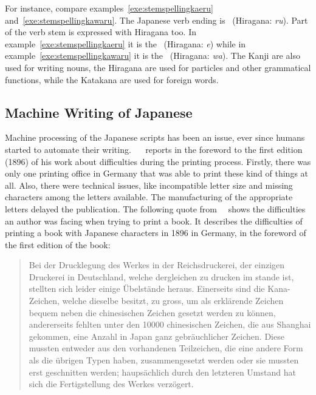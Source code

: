 For instance, compare examples~\ref{exe:stemspellingkaeru}
and~\ref{exe:stemspellingkawaru}. 
The Japanese verb ending is 
~(Hiragana: \emph{ru}). Part of the verb stem is expressed with
Hiragana too. In example~\ref{exe:stemspellingkaeru} it is the 
~(Hiragana: \emph{e}) while in example~\ref{exe:stemspellingkawaru} 
it is the ~(Hiragana: \emph{wa}).
The Kanji are also used for writing nouns, the Hiragana are used for particles 
and other grammatical functions, while the Katakana are used for foreign words.


\subsection{Machine Writing of Japanese}
\label{sec:machinewritingofjapanese}

Machine processing of the Japanese scripts has been an issue, ever since humans
started to automate their writing. 
~~\citeyear{Lange1922} reports in the foreword to the 
first edition (1896) of his work about difficulties during the printing process. 
Firstly, there was only one printing office in Germany that was able to print 
these kind of things at all. Also, there were technical issues, 
like incompatible letter size and missing characters among the letters 
available. The manufacturing of the appropriate letters delayed the publication.
The following quote from~~\citeyear{Lange1922} shows the 
difficulties an author was facing when trying to print a book. 
It describes the difficulties of printing a book with Japanese characters
in 1896 in Germany, in the foreword of the first edition of the book:
\begin{quote}
Bei der Drucklegung des Werkes in der Reichsdruckerei, der einzigen Druckerei 
in Deutschland, welche dergleichen zu drucken im stande ist, stellten sich 
leider einige Übelstände heraus. Einerseits sind die Kana-Zeichen, 
welche dieselbe besitzt, zu gross, um als erklärende Zeichen bequem neben die 
chinesischen Zeichen gesetzt werden zu können, andererseits fehlten unter den 
10000 chinesischen Zeichen, die aus Shanghai gekommen, eine Anzahl in Japan 
ganz gebräuchlicher Zeichen. 
Diese mussten entweder aus den vorhandenen Teilzeichen,
die eine andere Form als die übrigen Typen haben, zusammengesetzt werden oder 
sie mussten erst geschnitten werden; 
haupsächlich durch den letzteren Umstand hat sich die Fertigstellung des Werkes 
verzögert.\\
\end{quote}

